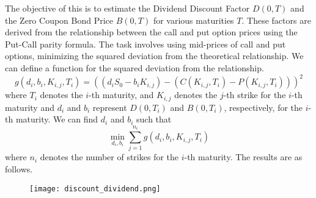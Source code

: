 The objective of this is to estimate the Dividend Discount Factor $D(0, T)$ and the Zero Coupon Bond Price $B(0, T)$ for various maturities $T$. These factors are derived from the relationship between the call and put option prices using the Put-Call parity formula. The task involves using mid-prices of call and put options, minimizing the squared deviation from the theoretical relationship. 
\vspace{1ex}
We can define a function for the squared deviation from the relationship.
\begin{equation}
g(d_i ,b_i,K_{i,j},T_i)=((d_i S_0 - b_i K_{i,j}) - (C(K_{i,j},T_i)-P(K_{i,j},T_i)))^2
\end{equation}
where \(T_i\) denotes the \(i\)-th maturity, and \(K_{i,j}\) denotes the \(j\)-th strike for the \(i\)-th maturity and \(d_i\) and \(b_i\) represent \(D(0,T_i)\) and \(B(0,T_i)\), respectively, for the \(i\)-th maturity.
\vspace{1ex}
We can find \(d_i\) and \(b_i\) such that
\[\min_{d_i,b_i} \sum_{j=1}^{n_i} g(d_i ,b_i,K_{i,j},T_i)\]
where \(n_i\) denotes the number of strikes for the \(i\)-th maturity.
The results are as follows.
\begin{figure}[H]
    \centering
    \texttt{[image: discount\_dividend.png]}
\end{figure}
